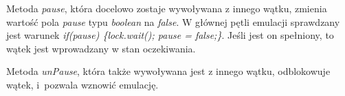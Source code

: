 Metoda \emph{pause}, która docelowo zostaje wywoływana z innego wątku, zmienia wartość pola \emph{pause} typu \emph{boolean} na \emph{false}.  W głównej pętli emulacji sprawdzany jest warunek \emph{if(pause) \{lock.wait(); pause = false;\}}. Jeśli jest on spełniony, to wątek jest wprowadzany w stan oczekiwania.

Metoda \emph{unPause}, która także wywoływana jest z innego wątku, odblokowuje wątek, i~pozwala wznowić emulację.



